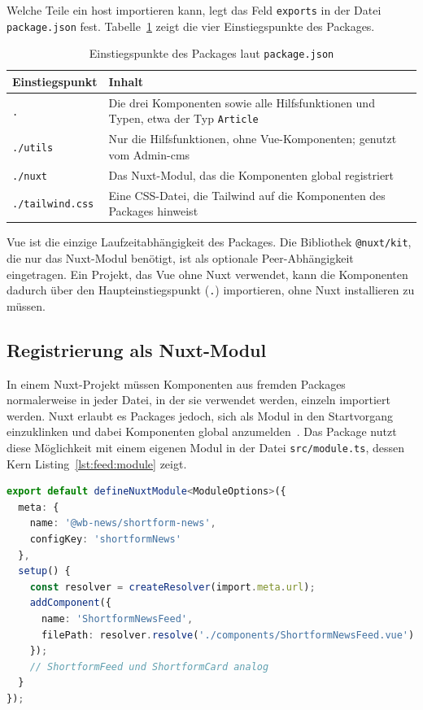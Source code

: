 Welche Teile ein \gls{host} importieren kann, legt das Feld \texttt{exports} in der Datei \texttt{package.json} fest.
Tabelle~\ref{tab:feed:exports} zeigt die vier Einstiegspunkte des Packages.

\begin{table}
    \centering
    \small
    \begin{tabularx}{\textwidth}{l >{\raggedright\arraybackslash}X}
        \toprule
        \textbf{Einstiegspunkt} & \textbf{Inhalt} \\
        \midrule
        \texttt{.} & Die drei Komponenten sowie alle Hilfsfunktionen und Typen, etwa der Typ \texttt{Article} \\
        \texttt{./utils} & Nur die Hilfsfunktionen, ohne Vue-Komponenten; genutzt vom Admin-\gls{cms} \\
        \texttt{./nuxt} & Das Nuxt-Modul, das die Komponenten global registriert \\
        \texttt{./tailwind.css} & Eine CSS-Datei, die Tailwind auf die Komponenten des Packages hinweist \\
        \bottomrule
    \end{tabularx}
    \caption{Einstiegspunkte des Packages laut \texttt{package.json}}
    \label{tab:feed:exports}
\end{table}

Vue ist die einzige Laufzeitabhängigkeit des Packages.
Die Bibliothek \texttt{@nuxt/kit}, die nur das Nuxt-Modul benötigt, ist als optionale Peer-Abhängigkeit eingetragen.
Ein Projekt, das Vue ohne Nuxt verwendet, kann die Komponenten dadurch über den Haupteinstiegspunkt (\texttt{.}) importieren, ohne Nuxt installieren zu müssen.

\subsection{Registrierung als Nuxt-Modul}\label{sec:feed:package:module}

In einem Nuxt-Projekt müssen Komponenten aus fremden Packages normalerweise in jeder Datei, in der sie verwendet werden, einzeln importiert werden.
Nuxt erlaubt es Packages jedoch, sich als Modul in den Startvorgang einzuklinken und dabei Komponenten global anzumelden~\cite{nuxtmodules}.
Das Package nutzt diese Möglichkeit mit einem eigenen Modul in der Datei \texttt{src/module.ts}, dessen Kern Listing~\ref{lst:feed:module} zeigt.

\begin{lstlisting}[float=tbp,language=TypeScript,caption={Registrierung der Komponenten im Nuxt-Modul (gekürzt)},label=lst:feed:module]
export default defineNuxtModule<ModuleOptions>({
  meta: {
    name: '@wb-news/shortform-news',
    configKey: 'shortformNews'
  },
  setup() {
    const resolver = createResolver(import.meta.url);
    addComponent({
      name: 'ShortformNewsFeed',
      filePath: resolver.resolve('./components/ShortformNewsFeed.vue')
    });
    // ShortformFeed und ShortformCard analog
  }
});
\end{lstlisting}

